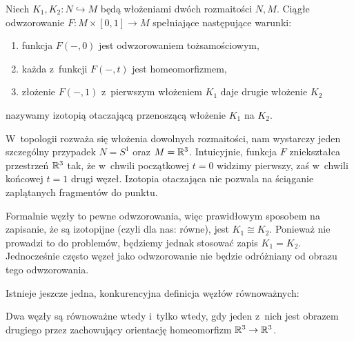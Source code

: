\begin{definition}
        Niech $K_1, K_2 \colon N \hookrightarrow M$ będą włożeniami dwóch rozmaitości $N, M$.
        Ciągłe odwzorowanie $F \colon M \times [0,1] \to M$ spełniające następujące warunki:
        \begin{enumerate}
            \item funkcja $F(-, 0)$ jest odwzorowaniem tożsamościowym,
            \item każda z~funkcji $F(-, t)$ jest homeomorfizmem,
            \item złożenie $F(-, 1)$ z~pierwszym włożeniem $K_1$ daje drugie włożenie $K_2$
        \end{enumerate}
        nazywamy izotopią otaczającą przenoszącą włożenie $K_1$ na $K_2$.
    \end{definition}
    
    W~topologii rozważa się włożenia dowolnych rozmaitości, nam wystarczy jeden szczególny przypadek $N = S^1$ oraz $M = \mathbb R^3$.
    Intuicyjnie, funkcja $F$ zniekształca przestrzeń $\mathbb R^3$ tak, że w~chwili początkowej $t = 0$ widzimy pierwszy, zaś w~chwili końcowej $t = 1$ drugi węzeł.
    Izotopia otaczająca nie pozwala na ściąganie zaplątanych fragmentów do punktu.
    
    Formalnie węzły to pewne odwzorowania, więc prawidłowym sposobem na zapisanie, że są izotopijne (czyli dla nas: równe), jest $K_1 \cong K_2$.
    Ponieważ nie prowadzi to do problemów, będziemy jednak stosować zapis $K_1 = K_2$.
    Jednocześnie często węzeł jako odwzorowanie nie będzie odróżniany od obrazu tego odwzorowania.
    
    Istnieje jeszcze jedna, konkurencyjna definicja węzłów równoważnych:

\begin{proposition}
\label{def:equivalent_knots_2}%
    Dwa węzły są równoważne wtedy i~tylko wtedy, gdy jeden z~nich jest obrazem drugiego przez zachowujący orientację homeomorfizm $\mathbb R^3 \to \mathbb R^3$.
\end{proposition}

